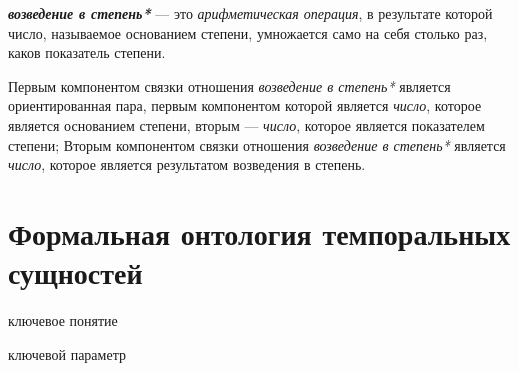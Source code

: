 \begin{SCn}
\begin{SCn}
\begin{SCn}
\end{SCn}

\textbf{\textit{возведение в степень*}} --- это \textit{арифметическая операция}, в результате которой число, называемое основанием степени, умножается само на себя столько раз, каков показатель степени.
	
Первым компонентом связки отношения \textit{возведение в степень*} является ориентированная пара, первым компонентом которой является \textit{число}, которое является основанием степени, вторым --- \textit{число}, которое является показателем степени; Вторым компонентом связки отношения \textit{возведение в степень*} является \textit{число}, которое является результатом возведения в степень.

\begin{SCn}	
\end{SCn}
	
\section{Формальная онтология темпоральных сущностей}
\label{sec_top_ontologies_temp}
	
\begin{SCn}
\begin{scnrelfromlist}{ключевое понятие}
\end{scnrelfromlist}

\begin{scnrelfromlist}{ключевой параметр}
\end{scnrelfromlist}
\end{SCn}
		

\end{SCn}
\end{SCn}
